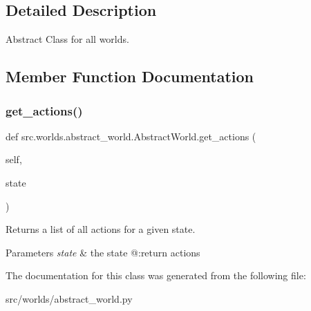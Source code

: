 \subsection{Detailed Description}
Abstract Class for all worlds. 

\subsection{Member Function Documentation}
\mbox{\label{classsrc_1_1worlds_1_1abstract__world_1_1_abstract_world_a177196a17a32460d8076eaffa643646b}} 
\subsubsection{\texorpdfstring{get\+\_\+actions()}{get\_actions()}}
{\footnotesize\ttfamily def src.\+worlds.\+abstract\+\_\+world.\+Abstract\+World.\+get\+\_\+actions (\begin{DoxyParamCaption}\item[{}]{self,  }\item[{}]{state }\end{DoxyParamCaption})}



Returns a list of all actions for a given state. 


\begin{DoxyParams}{Parameters}
{\em state} & the state @\+:return actions \\
\hline
\end{DoxyParams}


The documentation for this class was generated from the following file\+:\begin{DoxyCompactItemize}
\item 
src/worlds/abstract\+\_\+world.\+py\end{DoxyCompactItemize}
